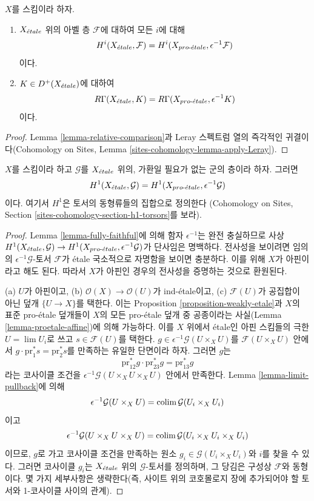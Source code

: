 \begin{lemma}
\label{lemma-compare-cohomology}
$X$를 스킴이라 하자.
\begin{enumerate}
\item $X_{\acute{e}tale}$ 위의 아벨 층 $\mathcal{F}$에 대하여 모든 $i$에 대해
$$
H^i(X_{\acute{e}tale}, \mathcal{F}) =
H^i(X_{pro\text{-}\acute{e}tale}, \epsilon^{-1}\mathcal{F})
$$
이다.
\item $K \in D^+(X_{\acute{e}tale})$에 대하여
$$
R\Gamma(X_{\acute{e}tale}, K) = R\Gamma(X_{pro\text{-}\acute{e}tale}, \epsilon^{-1}K)
$$
이다.
\end{enumerate}
\end{lemma}

\begin{proof}
Lemma \ref{lemma-relative-comparison}과 Leray 스펙트럼 열의 즉각적인
귀결이다(Cohomology on Sites, Lemma
\ref{sites-cohomology-lemma-apply-Leray}).
\end{proof}

\begin{lemma}
\label{lemma-compare-cohomology-nonabelian}
$X$를 스킴이라 하고 $\mathcal{G}$를 $X_{\acute{e}tale}$ 위의, 가환일 필요가
없는 군의 층이라 하자. 그러면
$$
H^1(X_{\acute{e}tale}, \mathcal{G}) =
H^1(X_{pro\text{-}\acute{e}tale}, \epsilon^{-1}\mathcal{G})
$$
이다. 여기서 $H^1$은 토서의 동형류들의 집합으로 정의한다
(Cohomology on Sites, Section
\ref{sites-cohomology-section-h1-torsors}를 보라).
\end{lemma}

\begin{proof}
Lemma \ref{lemma-fully-faithful}에 의해 함자 $\epsilon^{-1}$는 완전
충실하므로 사상
$H^1(X_{\acute{e}tale}, \mathcal{G}) \to
H^1(X_{pro\text{-}\acute{e}tale}, \epsilon^{-1}\mathcal{G})$가 단사임은 명백하다.
전사성을 보이려면 임의의 $\epsilon^{-1}\mathcal{G}$-토서
$\mathcal{F}$가 \'etale 국소적으로 자명함을 보이면 충분하다.
이를 위해 $X$가 아핀이라고 해도 된다. 따라서 $X$가 아핀인 경우의
전사성을 증명하는 것으로 환원된다.

\medskip\noindent
(a) $U$가 아핀이고, (b) $\mathcal{O}(X) \to \mathcal{O}(U)$가
ind-\'etale이고, (c) $\mathcal{F}(U)$가 공집합이 아닌 덮개
$\{U \to X\}$를 택한다. 이는 Proposition
\ref{proposition-weakly-etale}과 $X$의 표준 pro-\'etale 덮개들이
$X$의 모든 pro-\'etale 덮개 중 공종이라는 사실(Lemma
\ref{lemma-proetale-affine})에 의해 가능하다.
이를 $X$ 위에서 \'etale인 아핀 스킴들의 극한
$U = \lim U_i$로 쓰고 $s \in \mathcal{F}(U)$를 택한다.
$g \in \epsilon^{-1}\mathcal{G}(U \times_X U)$를
$\mathcal{F}(U \times_X U)$ 안에서
$g \cdot \text{pr}_1^*s = \text{pr}_2^*s$를 만족하는 유일한 단면이라
하자. 그러면 $g$는
$$
\text{pr}_{12}^*g \cdot \text{pr}_{23}^*g = \text{pr}_{13}^*g
$$
라는 코사이클 조건을
$\epsilon^{-1}\mathcal{G}(U \times_X U \times_X U)$ 안에서 만족한다.
Lemma \ref{lemma-limit-pullback}에 의해
$$
\epsilon^{-1}\mathcal{G}(U \times_X U) =
\mathop{\mathrm{colim}}\nolimits \mathcal{G}(U_i \times_X U_i)
$$
이고
$$
\epsilon^{-1}\mathcal{G}(U \times_X U \times_X U) =
\mathop{\mathrm{colim}}\nolimits \mathcal{G}(U_i \times_X U_i \times_X U_i)
$$
이므로, $g$로 가고 코사이클 조건을 만족하는 원소
$g_i \in \mathcal{G}(U_i \times_X U_i)$와 $i$를 찾을 수 있다.
그러면 코사이클 $g_i$는 $X_{\acute{e}tale}$ 위의 $\mathcal{G}$-토서를
정의하며, 그 당김은 구성상 $\mathcal{F}$와 동형이다. 몇 가지
세부사항은 생략한다(즉, 사이트 위의 코호몰로지 장에 추가되어야 할
토서와 1-코사이클 사이의 관계).
\end{proof}

